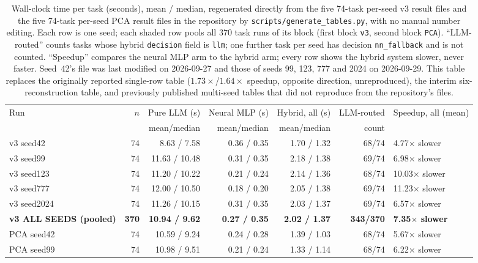 \documentclass[twoside,11pt]{article}
\begin{document}
\begin{table}[htbp]
\centering
\small
\caption{Wall-clock time per task (seconds), mean / median, regenerated
directly from the five 74-task per-seed v3 result files and the five 74-task
per-seed PCA result files in the repository by \texttt{scripts/generate\_tables.py},
with no manual number editing. Each row is one seed; each shaded row pools all $370$
task runs of its block (first block \texttt{v3}, second block \texttt{PCA}).
``LLM-routed'' counts tasks whose hybrid \texttt{decision} field is
\texttt{llm}; one further task per seed has decision \texttt{nn\_fallback} and
is not counted. ``Speedup'' compares the neural MLP arm to the hybrid arm;
every row shows the hybrid system slower, never faster. Seed~42's file was last modified
on 2026-09-27 and those of seeds 99, 123, 777 and 2024 on 2026-09-29. This table
replaces the originally reported single-row table
($1.73\times$/$1.64\times$ speedup, opposite direction, unreproduced), the
interim six-reconstruction table, and previously published multi-seed tables
that did not reproduce from the repository's files.}
\label{tab:timing_full}
\begin{tabular}{lrrrrrl}
\toprule
Run & $n$ & Pure LLM (s) & Neural MLP (s) & Hybrid, all (s) & LLM-routed & Speedup, all (mean) \\
    &     & mean/median  & mean/median    & mean/median      & count      &  \\
\midrule
v3 seed42 & 74 & 8.63 / 7.58 & 0.36 / 0.35 & 1.70 / 1.32 & 68/74 & 4.77$\times$ slower \\
v3 seed99 & 74 & 11.63 / 10.48 & 0.31 / 0.35 & 2.18 / 1.38 & 69/74 & 6.98$\times$ slower \\
v3 seed123 & 74 & 11.20 / 10.22 & 0.21 / 0.24 & 2.14 / 1.36 & 68/74 & 10.03$\times$ slower \\
v3 seed777 & 74 & 12.00 / 10.50 & 0.18 / 0.20 & 2.05 / 1.38 & 69/74 & 11.23$\times$ slower \\
v3 seed2024 & 74 & 11.26 / 10.15 & 0.31 / 0.35 & 2.03 / 1.37 & 69/74 & 6.57$\times$ slower \\
\rowcolor{black!8}
\textbf{v3 ALL SEEDS (pooled)} & \textbf{370} & \textbf{10.94 / 9.62} & \textbf{0.27 / 0.35} & \textbf{2.02 / 1.37} & \textbf{343/370} & \textbf{7.35$\times$ slower} \\
PCA seed42 & 74 & 10.59 / 9.24 & 0.24 / 0.28 & 1.39 / 1.03 & 68/74 & 5.67$\times$ slower \\
PCA seed99 & 74 & 10.98 / 9.51 & 0.21 / 0.24 & 1.33 / 1.14 & 68/74 & 6.22$\times$ slower \\

\end{tabular}
\end{table}
\end{document}
